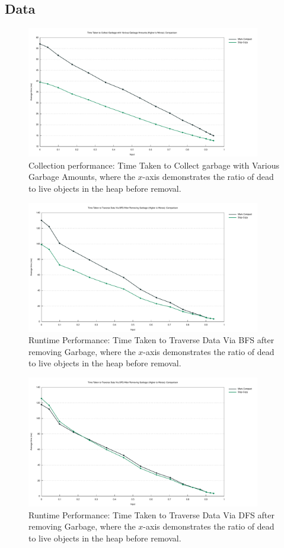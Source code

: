 \documentclass[index]{subfiles}
\begin{document}
\subsection{Data}
\begin{figure}[H]
    \centering
    \includegraphics[width=0.91\textwidth]{pics/collect.pdf}
    \caption{Collection performance: Time Taken to Collect garbage with Various Garbage Amounts, where the \(x\)-axis demonstrates the ratio of dead to live objects in the heap before removal.}
\end{figure}
\begin{figure}[H]
    \centering
    \includegraphics[width=0.91\textwidth]{pics/bfs.pdf}
    \caption{Runtime Performance: Time Taken to Traverse Data Via BFS after removing Garbage, where the \(x\)-axis demonstrates the ratio of dead to live objects in the heap before removal.}
\end{figure}
\begin{figure}[H]
    \centering
    \includegraphics[width=0.91\textwidth]{pics/dfs.pdf}
    \caption{Runtime Performance: Time Taken to Traverse Data Via DFS after removing Garbage, where the \(x\)-axis demonstrates the ratio of dead to live objects in the heap before removal.}
\end{figure}
\end{document}
